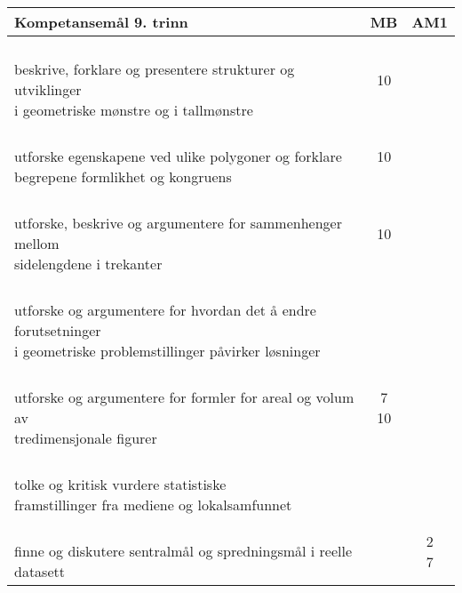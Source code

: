 \documentclass{article}
\begin{document}
\begin{center}
	\begin{tabular}{p{10.5cm} | c | c |} 
		\textbf{Kompetansemål 9. trinn} & \textbf{MB} & \textbf{AM1}\\ \hline
		\shortstack[l]{\\ beskrive, forklare og presentere strukturer og utviklinger\\ i geometriske mønstre og i tallmønstre
		} &\shortstack{10\\{}} &\shortstack{} \\ \hline
		
		\shortstack[l]{\\ utforske egenskapene ved ulike polygoner og forklare\\ begrepene formlikhet og kongruens
		} &\shortstack{10\\{}} &\shortstack{} \\ \hline
		
		\shortstack[l]{\\ utforske, beskrive og argumentere for sammenhenger mellom\\ sidelengdene i trekanter
		} &\shortstack{10\\{}} &\shortstack{} \\ \hline
		
		\shortstack[l]{\\ utforske og argumentere for hvordan det å endre forutsetninger \\i geometriske problemstillinger påvirker løsninger
		} &\shortstack{10} &\shortstack{} \\ \hline
		
		\shortstack[l]{\\ utforske og argumentere for formler for areal og volum av\\ tredimensjonale figurer
		} &\shortstack{7\\10} &\shortstack{} \\ \hline
		
		\shortstack[l]{\\ tolke og kritisk vurdere statistiske \\framstillinger fra mediene og lokalsamfunnet
		} &\shortstack{} &\shortstack{2} \\ \hline
		
		\shortstack[l]{\\ finne og diskutere sentralmål og spredningsmål i reelle datasett \\\phantom{a}
		} &\shortstack{} &\shortstack{2\\7} \\ \hline
		

\end{tabular}
\end{center}
\end{document}
